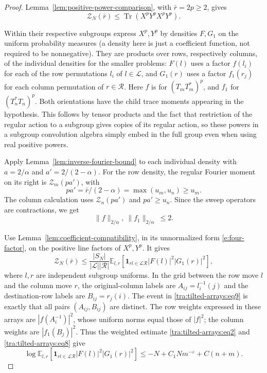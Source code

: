 \begin{proof}\label{tra:tilted-arrays:recursion-proof}
\label{tra:tilted-arrays:fourth-trace-and-inverse-transform}
Lemma~\ref{lem:positive-power-comparison}, with $\bar r=2p\ge2$,
gives
\begin{equation}
 \mathcal Z_N(\bar r)
 \le\operatorname{Tr}(X^pY^pX^pY^p).
 \label{tra:tilted-arrays:eq7}
\end{equation}

Within their respective subgroups express \(X^p,Y^p\) by densities \(F,G_1\) on the uniform probability measures (a density here is just a coefficient function, not required to be nonnegative). They are products over rows, respectively columns, of the individual densities for the smaller problems: \(F(l)\) uses a factor \(f(l_i)\) for each of the row permutations \(l_i\) of \(l\in\mathcal L\), and \(G_1(r)\) uses a factor \(f_1(r_j)\) for each column permutation of \(r\in\mathcal R\). Here $f$ is for $(T_mT_m^*)^p$, and $f_1$ for $(T_n^*T_n)^p$. Both orientations have the child trace moments appearing in the hypothesis. This follows by tensor products and the fact that restriction of the regular action to a subgroup gives copies of its regular action, so these powers in a subgroup convolution algebra simply embed in the full group even when using real positive powers.

Apply Lemma~\ref{lem:inverse-fourier-bound} to each individual
density with $a=2/\alpha$ and $a'=2/(2-\alpha)$. For the row density,
the regular Fourier moment on its right is
$\mathcal Z_m(pa')$, with
\[
 pa'=\bar r/(2-\alpha)=\max(u_m,u_n)\ge u_m.
\]
The column calculation uses $\mathcal Z_n(pa')$ and $pa'\ge u_n$.
Since the sweep operators are contractions, we get
\begin{equation}
 \|f\|_{2/\alpha},\ \|f_1\|_{2/\alpha}\ \le 2. \label{tra:tilted-arrays:eq8}
\end{equation}

Use Lemma~\ref{lem:coefficient-compatibility}, in its unnormalized
form \eqref{e:four-factor}, on the positive line factors of $X^p,Y^p$.
It gives
\begin{equation}
 \mathcal Z_N(\bar r)
 \le\frac{|S_N|}{|\mathcal L||\mathcal R|}
 \mathbb E_{l,r}\!\left[
   \mathbf1_{rl\in\mathcal L\mathcal R}|F(l)|^2|G_1(r)|^2\right],
 \label{tra:tilted-arrays:eq9}
\end{equation}
where $l,r$ are independent subgroup uniforms. In the grid between
the row move $l$ and the column move $r$, the original-column labels
are $A_{ij}=l_i^{-1}(j)$ and the destination-row labels are
$B_{ij}=r_j(i)$. The event in \eqref{tra:tilted-arrays:eq9} is exactly
that all pairs $(A_{ij},B_{ij})$ are distinct. The row weights expressed
in these arrays are $|f(A_i^{-1})|^2$, whose uniform norms equal those
of $|f|^2$; the column weights are $|f_1(B_j)|^2$.
Thus the weighted estimate \eqref{tra:tilted-arrays:eq2} and
\eqref{tra:tilted-arrays:eq8} give
\[
 \log\mathbb E_{l,r}\!\left[
   \mathbf1_{rl\in\mathcal L\mathcal R}|F(l)|^2|G_1(r)|^2\right]
 \le-N+C_1Nm^{-\varepsilon}+C(n+m).
\]


\end{proof}
